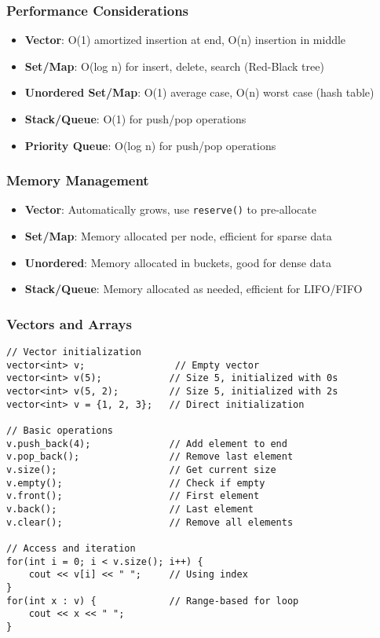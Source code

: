 \documentclass[11pt,a4paper]{article}
\begin{document}
\subsubsection{Performance Considerations}
\begin{itemize}
\item \textbf{Vector}: O(1) amortized insertion at end, O(n) insertion in middle
\item \textbf{Set/Map}: O(log n) for insert, delete, search (Red-Black tree)
\item \textbf{Unordered Set/Map}: O(1) average case, O(n) worst case (hash table)
\item \textbf{Stack/Queue}: O(1) for push/pop operations
\item \textbf{Priority Queue}: O(log n) for push/pop operations
\end{itemize}

\subsubsection{Memory Management}
\begin{itemize}
\item \textbf{Vector}: Automatically grows, use \texttt{reserve()} to pre-allocate
\item \textbf{Set/Map}: Memory allocated per node, efficient for sparse data
\item \textbf{Unordered}: Memory allocated in buckets, good for dense data
\item \textbf{Stack/Queue}: Memory allocated as needed, efficient for LIFO/FIFO
\end{itemize}

\newpage

\subsubsection{Vectors and Arrays}

\begin{lstlisting}[caption={Basic Vector Operations}]
// Vector initialization
vector<int> v;                // Empty vector
vector<int> v(5);            // Size 5, initialized with 0s
vector<int> v(5, 2);         // Size 5, initialized with 2s
vector<int> v = {1, 2, 3};   // Direct initialization

// Basic operations
v.push_back(4);              // Add element to end
v.pop_back();                // Remove last element
v.size();                    // Get current size
v.empty();                   // Check if empty
v.front();                   // First element
v.back();                    // Last element
v.clear();                   // Remove all elements

// Access and iteration
for(int i = 0; i < v.size(); i++) {
    cout << v[i] << " ";     // Using index
}
for(int x : v) {             // Range-based for loop
    cout << x << " ";
}
\end{lstlisting}
\end{document}
